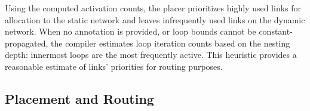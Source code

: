 
Using the computed activation counts, the placer prioritizes highly used links for allocation to the static network and leaves infrequently used links on the dynamic network. 
When no annotation is provided, or loop bounds cannot be constant-propagated, the compiler estimates loop iteration counts based on the nesting depth: innermost loops are the most frequently active.
This heuristic provides a reasonable estimate of links' priorities for routing purposes.
\subsection{Placement and Routing} \label{sec:mapping}
